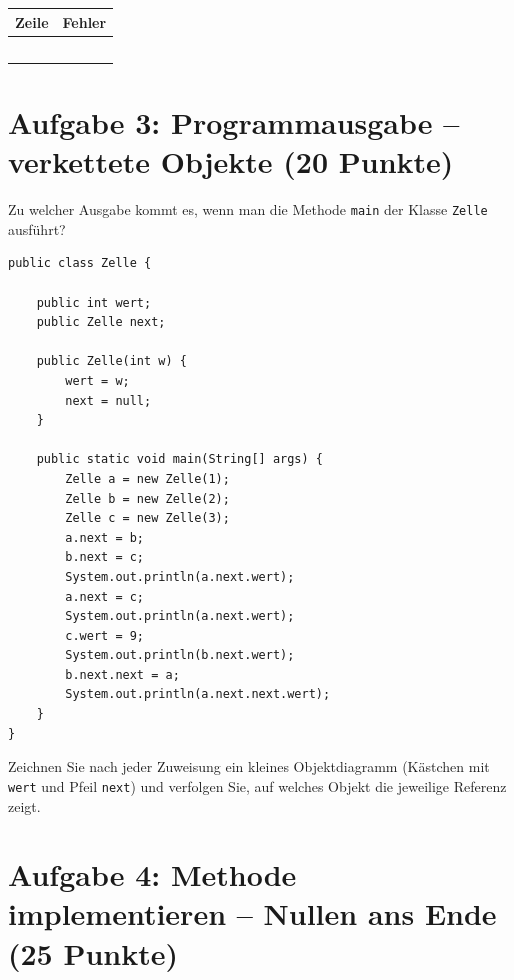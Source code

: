 \documentclass[
	fontsize=12pt,
	paper=a4,
	numbers=noenddot,
	parskip=half,
	openany
]{scrbook}
\begin{document}
\begin{center}
\begin{tabular}{|p{1.6cm}|p{10.5cm}|}
	\hline
	\textbf{Zeile} & \textbf{Fehler} \\ \hline
	& \\[2cm] \hline
	& \\[2cm] \hline
	& \\[2cm] \hline
	& \\[2cm] \hline
	& \\[2cm] \hline
\end{tabular}
\end{center}

\clearpage
\section*{Aufgabe 3: Programmausgabe -- verkettete Objekte \hfill (20 Punkte)}

Zu welcher Ausgabe kommt es, wenn man die Methode \texttt{main} der Klasse \texttt{Zelle} ausführt?

\begin{lstlisting}
public class Zelle {

    public int wert;
    public Zelle next;

    public Zelle(int w) {
        wert = w;
        next = null;
    }

    public static void main(String[] args) {
        Zelle a = new Zelle(1);
        Zelle b = new Zelle(2);
        Zelle c = new Zelle(3);
        a.next = b;
        b.next = c;
        System.out.println(a.next.wert);
        a.next = c;
        System.out.println(a.next.wert);
        c.wert = 9;
        System.out.println(b.next.wert);
        b.next.next = a;
        System.out.println(a.next.next.wert);
    }
}
\end{lstlisting}

\begin{hinweis}[Empfehlung]
	Zeichnen Sie nach jeder Zuweisung ein kleines Objektdiagramm (Kästchen mit \texttt{wert} und Pfeil \texttt{next}) und verfolgen Sie, auf welches Objekt die jeweilige Referenz zeigt.
\end{hinweis}

\clearpage
\section*{Aufgabe 4: Methode implementieren -- Nullen ans Ende \hfill (25 Punkte)}
\end{document}
